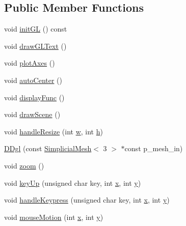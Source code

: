 \subsection*{Public Member Functions}
\begin{DoxyCompactItemize}
\item 
void \hyperlink{structmodel_1_1_d_dgl_a49832fa5d2f2da38ab259fe536928747}{init\+G\+L} () const 
\item 
void \hyperlink{structmodel_1_1_d_dgl_a4147fe9f78445d36263fc7fa8abfc267}{draw\+G\+L\+Text} ()
\item 
void \hyperlink{structmodel_1_1_d_dgl_aa5b805f33464ae0a80efb0e542363d3f}{plot\+Axes} ()
\item 
void \hyperlink{structmodel_1_1_d_dgl_af491a9524f6a28b9891445a407397d04}{auto\+Center} ()
\item 
void \hyperlink{structmodel_1_1_d_dgl_a13b8990b9d250215ba4153b7625d703d}{display\+Func} ()
\item 
void \hyperlink{structmodel_1_1_d_dgl_ac0f854bc0902989d131404e9f1d46a0d}{draw\+Scene} ()
\item 
void \hyperlink{structmodel_1_1_d_dgl_acce23164ddb84e9fd57e77f86a0c86a0}{handle\+Resize} (int \hyperlink{plot_cells_8m_aad57484016654da87125db86f4227ea3}{w}, int \hyperlink{_adams_bashforth_8m_aeddc3ffe9fe529b73ed9521611f731b6}{h})
\item 
\hyperlink{structmodel_1_1_d_dgl_a63df5d0b43994aa03e182b6ba84613ab}{D\+Dgl} (const \hyperlink{classmodel_1_1_simplicial_mesh}{Simplicial\+Mesh}$<$ 3 $>$ $\ast$const p\+\_\+mesh\+\_\+in)
\item 
void \hyperlink{structmodel_1_1_d_dgl_ab9c82040cc521b13740adf7fdfda2594}{zoom} ()
\item 
void \hyperlink{structmodel_1_1_d_dgl_ad458dcc39b9d5833d0700cbdcf4ffd86}{key\+Up} (unsigned char key, int \hyperlink{generate_s_t_lcyl_8m_a9336ebf25087d91c818ee6e9ec29f8c1}{x}, int \hyperlink{generate_s_t_lcyl_8m_a2fb1c5cf58867b5bbc9a1b145a86f3a0}{y})
\item 
void \hyperlink{structmodel_1_1_d_dgl_aef5ece13effd0dc2630fc665d2e42f61}{handle\+Keypress} (unsigned char key, int \hyperlink{generate_s_t_lcyl_8m_a9336ebf25087d91c818ee6e9ec29f8c1}{x}, int \hyperlink{generate_s_t_lcyl_8m_a2fb1c5cf58867b5bbc9a1b145a86f3a0}{y})
\item 
void \hyperlink{structmodel_1_1_d_dgl_a8bcb64c4e1421152ca0d6dee598346cd}{mouse\+Motion} (int \hyperlink{generate_s_t_lcyl_8m_a9336ebf25087d91c818ee6e9ec29f8c1}{x}, int \hyperlink{generate_s_t_lcyl_8m_a2fb1c5cf58867b5bbc9a1b145a86f3a0}{y})

\end{DoxyCompactItemize}
